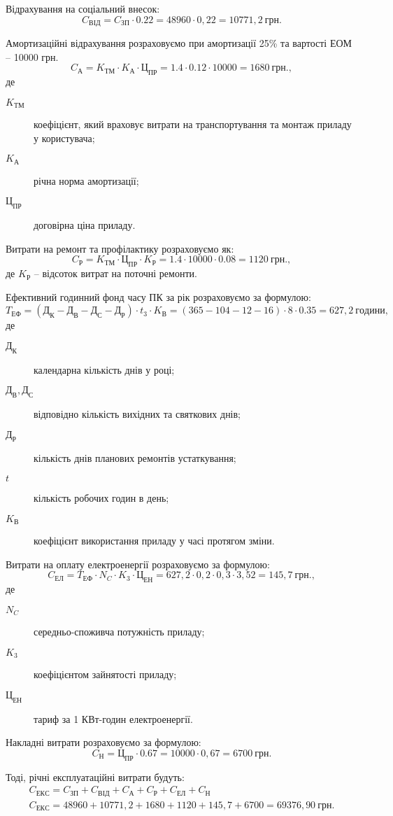 \documentclass[../diploma]{subfiles}
\begin{document}
Відрахування на соціальний внесок:
$$
C_{ВІД} = C_{ЗП}\cdot 0.22 = 48960\cdot 0,22 = 10771,2~грн.
$$

Амортизаційні відрахування розраховуємо при амортизації 25\% та вартості ЕОМ – 10000 грн.
$$
C_А = K_{ТМ}\cdot K_А\cdot Ц_{ПР} = 1.4\cdot 0.12\cdot 10000 = 1680~грн.,
$$
де
\begin{description}
\item[$K_{ТМ}$] коефіцієнт, який враховує витрати на транспортування та монтаж приладу у користувача;
\item[$K_А$] річна норма амортизації;
\item[$Ц_{ПР}$] договірна ціна приладу.
\end{description}

Витрати на ремонт та профілактику розраховуємо як:
$$
C_Р = K_{ТМ}\cdot Ц_{ПР}\cdot K_Р = 1.4\cdot 10000\cdot 0.08 = 1120~грн.,
$$
де $K_Р$ -- відсоток витрат на поточні ремонти.

Ефективний годинний фонд часу ПК за рік розраховуємо за формулою:
$$
T_{ЕФ} = (Д_К - Д_В - Д_С - Д_Р)\cdot t_3\cdot K_В = (365 - 104 - 12 - 16)\cdot 8\cdot 0.35 = 627,2~години,
$$
де
\begin{description}
\item[$Д_К$] календарна кількість днів у році;
\item[$Д_В, Д_С$] відповідно кількість вихідних та святкових днів;
\item[$Д_Р$] кількість днів планових ремонтів устаткування;
\item[$t$] кількість робочих годин в день;
\item[$K_В$] коефіцієнт використання приладу у часі протягом зміни.
\end{description}

Витрати на оплату електроенергії розраховуємо за формулою:
$$
C_{ЕЛ} = T_{ЕФ}\cdot N_C\cdot K_3\cdot Ц_{ЕН} = 627,2\cdot 0,2\cdot 0,3\cdot 3,52 = 145,7~грн.,
$$
де
\begin{description}
\item[$N_C$] середньо-споживча потужність приладу;
\item[$K_3$] коефіцієнтом зайнятості приладу;
\item[$Ц_{ЕН}$] тариф за 1 КВт-годин електроенергії.
\end{description}

Накладні витрати розраховуємо за формулою:
$$
C_Н = Ц_{ПР}\cdot 0.67 = 10000\cdot 0,67 = 6700~грн.
$$

Тоді, річні експлуатаційні витрати будуть:
\begin{gather*}
C_{ЕКС} = C_{ЗП} + C_{ВІД} + C_{А} + C_{Р} + C_{ЕЛ} + C_{Н} \\
C_{ЕКС} = 48960 + 10771,2 + 1680 + 1120 + 145,7 + 6700 = 69376,90~грн.
\end{gather*}
\end{document}
